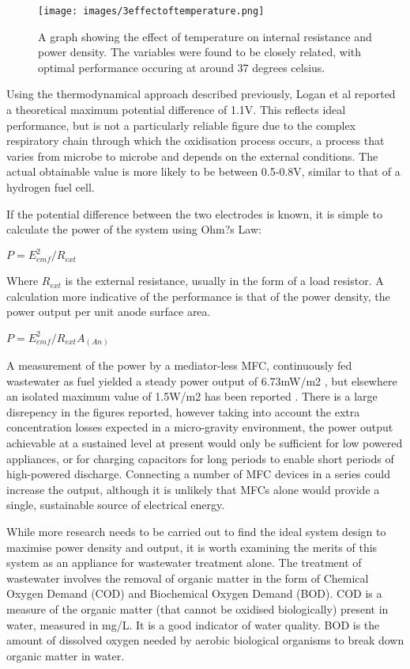 \documentclass[12pt]{article}
\begin{document}
\begin{figure}[ht]
\centering
\texttt{[image: images/3effectoftemperature.png]}
\caption[\cite{li2013effect}]{A graph showing the effect of temperature on internal resistance and power density. The variables were found to be closely related, with optimal performance occuring at around 37 degrees celsius.}
\label{fig:3effectoftemperature}
\end{figure}

Using the thermodynamical approach described previously, Logan et al \cite{logan2006microbial} reported a theoretical maximum potential difference of 1.1V. This reflects ideal performance, but is not a particularly reliable figure due to the complex respiratory chain through which the oxidisation process occurs, a process that varies from microbe to microbe and depends on the external conditions. The actual obtainable value is more likely to be between 0.5-0.8V, similar to that of a hydrogen fuel cell.\cite{du2007state,logan2005simultaneous}

If the potential difference between the two electrodes is known, it is simple to calculate the power of the system using Ohm?s Law:

$P = E_{emf} ^{2} / R_{ext}$

Where $R_{ext}$ is the external resistance, usually in the form of a load resistor. A calculation more indicative of the performance is that of the power density, the power output per unit anode surface area.

$P = E_{emf} ^{2} / R_{ext} A_(An)$

A measurement of the power by a mediator-less MFC, continuously fed wastewater as fuel yielded a steady power output of 6.73mW/m2 \cite{ghangrekar2006microbial}, but elsewhere an isolated maximum value of 1.5W/m2 has been reported \cite{logan2008microbial}. There is a large disrepency in the figures reported, however taking into account the extra concentration losses expected in a micro-gravity environment, the power output achievable at a sustained level at present would only be sufficient for low powered appliances, or for charging capacitors for long periods to enable short periods of high-powered discharge. Connecting a number of MFC devices in a series could increase the output, although it is unlikely that MFCs alone would provide a single, sustainable source of electrical energy.

While more research needs to be carried out to find the ideal system design to maximise power density and output, it is worth examining the merits of this system as an appliance for wastewater treatment alone. The treatment of wastewater involves the removal of organic matter in the form of Chemical Oxygen Demand (COD) and Biochemical Oxygen Demand (BOD). COD is a measure of the organic matter (that cannot be oxidised biologically) present in water, measured in mg/L. It is a good indicator of water quality. BOD is the amount of dissolved oxygen needed by aerobic biological organisms to break down organic matter in water. \cite{surez2005determination} 
\end{document}

